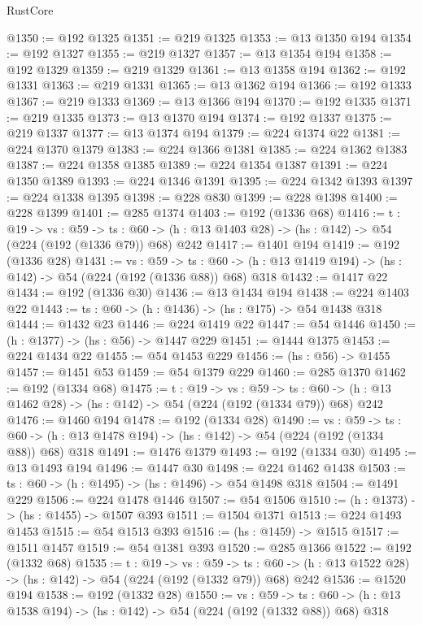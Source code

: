 \begin{lexlean}{RustCore}
\begin{coremodule}
@1350 := @192 @1325
@1351 := @219 @1325
@1353 := @13 @1350 @194
@1354 := @192 @1327
@1355 := @219 @1327
@1357 := @13 @1354 @194
@1358 := @192 @1329
@1359 := @219 @1329
@1361 := @13 @1358 @194
@1362 := @192 @1331
@1363 := @219 @1331
@1365 := @13 @1362 @194
@1366 := @192 @1333
@1367 := @219 @1333
@1369 := @13 @1366 @194
@1370 := @192 @1335
@1371 := @219 @1335
@1373 := @13 @1370 @194
@1374 := @192 @1337
@1375 := @219 @1337
@1377 := @13 @1374 @194
@1379 := @224 @1374 @22
@1381 := @224 @1370 @1379
@1383 := @224 @1366 @1381
@1385 := @224 @1362 @1383
@1387 := @224 @1358 @1385
@1389 := @224 @1354 @1387
@1391 := @224 @1350 @1389
@1393 := @224 @1346 @1391
@1395 := @224 @1342 @1393
@1397 := @224 @1338 @1395
@1398 := @228 @830
@1399 := @228 @1398
@1400 := @228 @1399
@1401 := @285 @1374
@1403 := @192 (@1336 @68)
@1416 := {t : @19} ->
  {vs : @59} ->
  {ts : @60} -> (h : @13 @1403 @28) -> (hs : @142) -> @54 (@224 (@192 (@1336 @79)) @68) @242
@1417 := @1401 @194
@1419 := @192 (@1336 @28)
@1431 := {vs : @59} ->
  {ts : @60} -> (h : @13 @1419 @194) -> (hs : @142) -> @54 (@224 (@192 (@1336 @88)) @68) @318
@1432 := @1417 @22
@1434 := @192 (@1336 @30)
@1436 := @13 @1434 @194
@1438 := @224 @1403 @22
@1443 := {ts : @60} -> (h : @1436) -> (hs : @175) -> @54 @1438 @318
@1444 := @1432 @23
@1446 := @224 @1419 @22
@1447 := @54 @1446
@1450 := (h : @1377) -> (hs : @56) -> @1447 @229
@1451 := @1444 @1375
@1453 := @224 @1434 @22
@1455 := @54 @1453 @229
@1456 := (hs : @56) -> @1455
@1457 := @1451 @53
@1459 := @54 @1379 @229
@1460 := @285 @1370
@1462 := @192 (@1334 @68)
@1475 := {t : @19} ->
  {vs : @59} ->
  {ts : @60} -> (h : @13 @1462 @28) -> (hs : @142) -> @54 (@224 (@192 (@1334 @79)) @68) @242
@1476 := @1460 @194
@1478 := @192 (@1334 @28)
@1490 := {vs : @59} ->
  {ts : @60} -> (h : @13 @1478 @194) -> (hs : @142) -> @54 (@224 (@192 (@1334 @88)) @68) @318
@1491 := @1476 @1379
@1493 := @192 (@1334 @30)
@1495 := @13 @1493 @194
@1496 := @1447 @30
@1498 := @224 @1462 @1438
@1503 := {ts : @60} -> (h : @1495) -> (hs : @1496) -> @54 @1498 @318
@1504 := @1491 @229
@1506 := @224 @1478 @1446
@1507 := @54 @1506
@1510 := (h : @1373) -> (hs : @1455) -> @1507 @393
@1511 := @1504 @1371
@1513 := @224 @1493 @1453
@1515 := @54 @1513 @393
@1516 := (hs : @1459) -> @1515
@1517 := @1511 @1457
@1519 := @54 @1381 @393
@1520 := @285 @1366
@1522 := @192 (@1332 @68)
@1535 := {t : @19} ->
  {vs : @59} ->
  {ts : @60} -> (h : @13 @1522 @28) -> (hs : @142) -> @54 (@224 (@192 (@1332 @79)) @68) @242
@1536 := @1520 @194
@1538 := @192 (@1332 @28)
@1550 := {vs : @59} ->
  {ts : @60} -> (h : @13 @1538 @194) -> (hs : @142) -> @54 (@224 (@192 (@1332 @88)) @68) @318

\end{coremodule}
\end{lexlean}
